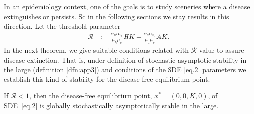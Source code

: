 	In an epidemiology context, one of the goals is to study  sceneries where a 
disease extinguishes or persists. So in the following sections we stay 
results in this direction. Let the threshold parameter
\begin{align*}
	\mathcal{R} &:= 
	\frac{
		\alpha_{h} \alpha_{v_{h}}
	}{
		\mu_{h} \mu_{v}
	} H K
	+
	\frac{
		\alpha_{a} \alpha_{v_{a}} 
	}{
		\mu_{a} \mu_{v}
	} A K.
\end{align*}
In the next theorem, we give suitable conditions related with $\mathcal{R}$ 
value to assure disease extinction. That is, under definition of 
stochastic asymptotic stability in the large (definition \autoref{dfn:app3}) 
and conditions of the SDE \eqref{eq.2} parameters
we establish this kind of stability for the disease-free equilibrium point.

\begin{theorem}\label{theo:GSAS}
		If $\mathcal{R}<1$, then the disease-free equilibrium point, 
	$x^{*}=(0,0,K,0)$, of SDE~\eqref{eq.2} is globally stochastically 
	asymptotically stable in the large.
\end{theorem}
